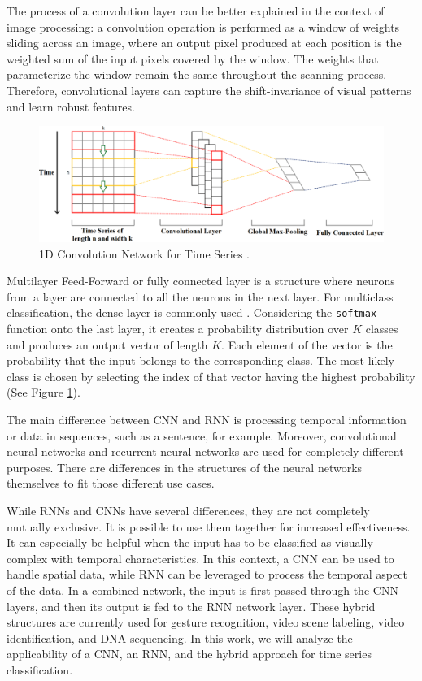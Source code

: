 The process of a convolution layer can be better explained in the context of image processing: a convolution operation is performed as a window of weights sliding across an image, where an output pixel produced at each position is the weighted sum of the input pixels covered by the window. The weights that parameterize the window remain the same throughout the scanning process. Therefore, convolutional layers can capture the shift-invariance of visual patterns and learn robust features.

\begin{figure}[htb]
	\centering
	\includegraphics[scale=0.25]{../Figures/1d-cnn}
	\caption{1D Convolution Network for Time Series \cite{Kim2014}.}
	\label{Fig:1DCNN}
\end{figure}

Multilayer Feed-Forward or fully connected layer is a structure where neurons from a layer are connected to all the neurons in the next layer. For multiclass classification, the dense layer is commonly used \cite{Albawi2017}. Considering the \texttt{softmax} function onto the last layer, it creates a probability distribution over $K$ classes and produces an output vector of length $K$. Each element of the vector is the probability that the input belongs to the corresponding class. The most likely class is chosen by selecting the index of that vector having the highest probability (See Figure \ref{Fig:1DCNN}).

The main difference between CNN and RNN is processing temporal information or data in sequences, such as a sentence, for example. Moreover, convolutional neural networks and recurrent neural networks are used for completely different purposes. There are differences in the structures of the neural networks themselves to fit those different use cases.  

While RNNs and CNNs have several differences, they are not completely mutually exclusive. It is possible to use them together for increased effectiveness. It can especially be helpful when the input has to be classified as visually complex with temporal characteristics. In this context, a CNN can be used to handle spatial data, while RNN can be leveraged to process the temporal aspect of the data. In a combined network, the input is first passed through the CNN layers, and then its output is fed to the RNN network layer. These hybrid structures are currently used for gesture recognition, video scene labeling, video identification, and DNA sequencing. In this work, we will analyze the applicability of a CNN, an RNN, and the hybrid approach for time series classification.

